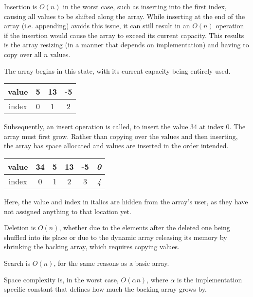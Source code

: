 \documentclass[]{article}
\begin{document}
Insertion is $O(n)$ in the worst case, such as inserting into the first index, causing all values to be shifted along the array. While inserting at the end of the array (i.e. appending) avoids this issue, it can still result in an $O(n)$ operation if the insertion would cause the array to exceed its current capacity. This results is the array resizing (in a manner that depends on implementation) and having to copy over all $n$ values.

\begin{table}[h!]
\centering
The array begins in this state, with its current capacity being entirely used.

\vspace{2mm}

\begin{tabular}{|c|c|c|c|}
\hline value & 5 & 13 & -5 \\
\hline index & 0 & 1 & 2 \\
\hline
\end{tabular}

\vspace{2mm}

Subsequently, an insert operation is called, to insert the value $34$ at index 0. The array must first grow. Rather than copying over the values and then inserting, the array has space allocated and values are inserted in the order intended.

\vspace{2mm}

\begin{tabular}{|c|c|c|c|c|c|}
\hline value & 34 & 5 & 13 & -5 & \textit{0} \\
\hline index & 0 & 1 & 2 & 3 & \textit{4} \\
\hline
\end{tabular}

\vspace{2mm}

Here, the value and index in italics are hidden from the array's user, as they have not assigned anything to that location yet.
\end{table}

Deletion is $O(n)$, whether due to the elements after the deleted one being shuffled into its place or due to the dynamic array releasing its memory by shrinking the backing array, which requires copying values.

Search is $O(n)$, for the same reasons as a basic array.

Space complexity is, in the worst case, $O(\alpha n)$, where $\alpha$ is the implementation specific constant that defines how much the backing array grows by.
\end{document}
